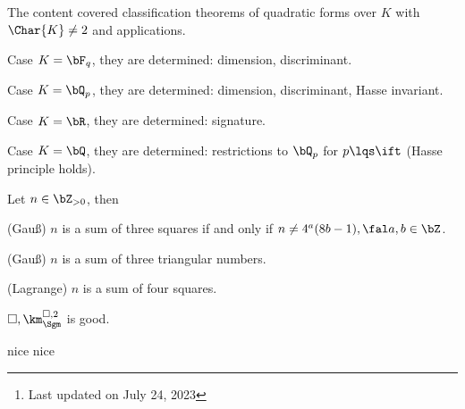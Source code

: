 \documentclass[a4paper, twoside]{article}
\title{\tbf{Learning note of AWS}}
\author{\tbf{Notes} by Cong Wen, 07/2023}
\date{}
\begin{document}
\maketitle
\thispagestyle{empty}
\begin{abstract}
	This is my self-use notes\footnote{Last updated on July 24, 2023} when reading materials of . Please reach out if you find anything incorrect.

\end{abstract}
\tableofcontents





The content covered classification theorems of quadratic forms over $K$ with $\Char{K}\neq2$ and applications.


Case $K=\bF_{q}$, they are determined: dimension, discriminant.

Case $K=\bQ_{p}$, they are determined: dimension, discriminant, Hasse invariant.

Case $K=\bR$, they are determined: signature.

Case $K=\bQ$, they are determined: restrictions to $\bQ_{p}$ for $p\lqs\ift$ (Hasse principle holds).



\begin{thm}
	Let $n\in\bZ_{>0}$, then
	\begin{itm}
		\item (Gau{\ss}) $n$ is a sum of three squares if and only if $n\neq4^{a}(8b-1),\fal a,b\in\bZ$.
		\item (Gau{\ss}) $n$ is a sum of three triangular numbers.
		\item (Lagrange) $n$ is a sum of four squares.
	\end{itm}
\end{thm}


$\Box, \km_{\Sgm}^{\Box,2}$ is good.

nice nice



\end{document}
